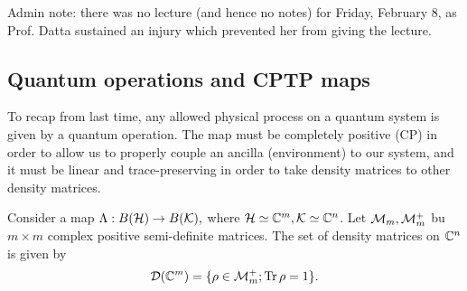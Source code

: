 Admin note: there was no lecture (and hence no notes) for Friday, February 8, as Prof. Datta sustained an injury which prevented her from giving the lecture.

\subsection*{Quantum operations and CPTP maps}
To recap from last time, any allowed physical process on a quantum system is given by a quantum operation. The map must be completely positive (CP) in order to allow us to properly couple an ancilla (environment) to our system, and it must be linear and trace-preserving in order to take density matrices to other density matrices.

Consider a map $\Lambda:B(\mathcal H)\to B(\mathcal{K}),$ where $\mathcal H\simeq \mathbb{C}^m,\mathcal{K}\simeq \mathbb{C}^n$. Let $\mathcal{M}_m, \mathcal{M}_m^+$ bu $m\times m$ complex positive semi-definite matrices. The set of density matrices on $\mathbb{C}^n$ is given by
\begin{equation}
    \mathcal{D}(\mathbb{C}^m)=\{\rho \in \mathcal{M}_m^+; \operatorname{Tr} \rho = 1\}.
\end{equation}

